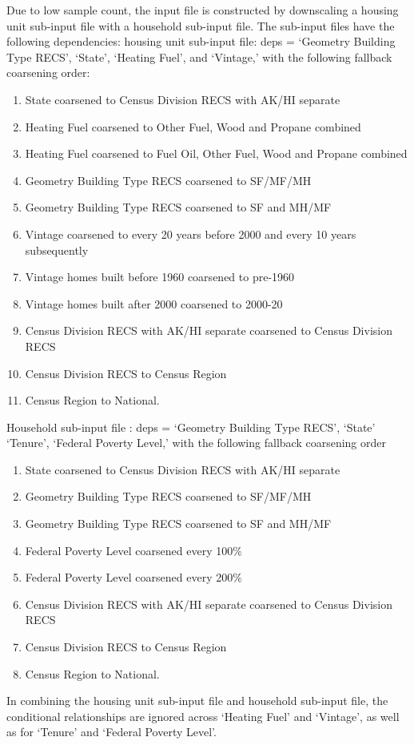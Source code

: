 Due to low sample count, the input file is constructed by downscaling a housing unit sub-input file with a household sub-input file. The sub-input files have the following dependencies: 
housing unit sub-input file: deps = `Geometry Building Type RECS', `State', `Heating Fuel', and `Vintage,' with the following fallback coarsening order:
\begin{enumerate}
    \item  State coarsened to Census Division RECS with AK/HI separate 
    \item Heating Fuel coarsened to Other Fuel, Wood and Propane combined 
    \item Heating Fuel coarsened to Fuel Oil, Other Fuel, Wood and Propane combined 
    \item Geometry Building Type RECS coarsened to SF/MF/MH 
    \item  Geometry Building Type RECS coarsened to SF and MH/MF 
    \item  Vintage coarsened to every 20 years before 2000 and every 10 years subsequently 
    \item Vintage homes built before 1960 coarsened to pre-1960 
    \item Vintage homes built after 2000 coarsened to 2000-20 
    \item Census Division RECS with AK/HI separate coarsened to Census Division RECS 
    \item Census Division RECS to Census Region 
    \item Census Region to National. 
\end{enumerate}
Household sub-input file : deps = `Geometry Building Type RECS', `State' `Tenure', `Federal Poverty Level,' with the following fallback coarsening order
\begin{enumerate}
\item   State coarsened to Census Division RECS with AK/HI separate 
\item  Geometry Building Type RECS coarsened to SF/MF/MH 
\item  Geometry Building Type RECS coarsened to SF and MH/MF 
\item  Federal Poverty Level coarsened every 100\% 
\item Federal Poverty Level coarsened every 200\%
\item Census Division RECS with AK/HI separate coarsened to Census Division RECS 
\item Census Division RECS to Census Region 
\item Census Region to National. 
\end{enumerate}
In combining the housing unit sub-input file and household sub-input file, the conditional relationships are ignored across `Heating Fuel' and `Vintage', as well as for `Tenure' and `Federal Poverty Level'.

